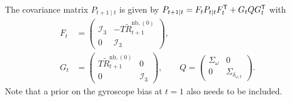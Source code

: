 The covariance matrix $P_{t+1 \mid t}$ is given by $P_{t+1 \mid t} = F_{t} P_{t \mid t} F_{t}^{\mathsf{T}} + G_{t} Q G_{t}^{\mathsf{T}}$ with
\begin{subequations}
\label{eq:app-estGyroBias-timeUpdateFiltOpt}
\begin{align}
F_t &= \begin{pmatrix}
\mathcal{I}_3 & -T \tilde{R}_{t+1}^{\text{nb},(0)} \\
0 & \mathcal{I}_3
\end{pmatrix}, \label{eq:app-estGyroBias-timeUpdateFiltOpt-F} \\
G_t &= \begin{pmatrix} T \tilde{R}_{t+1}^{\text{nb},(0)} & 0 \\ 0 & \mathcal{I}_3 \end{pmatrix}, \qquad
Q = \begin{pmatrix} \Sigma_\omega & 0 \\ 0 & \Sigma_{\delta_{\omega,t}} \end{pmatrix}. \label{eq:app-estGyroBias-timeUpdateFiltOpt-GQ}
\end{align} 
\end{subequations}
Note that a prior on the gyroscope bias at $t = 1$ also needs to be included. 

